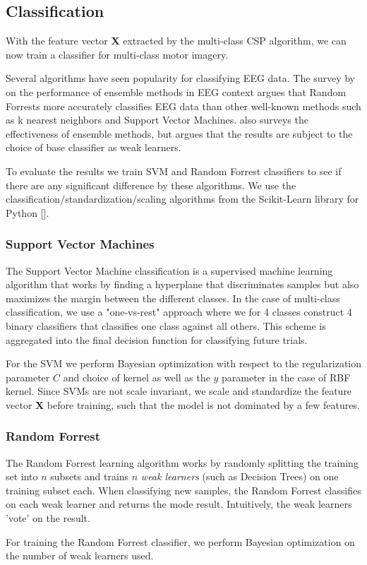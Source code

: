 \subsection{Classification}
With the feature vector $\mathbf{X}$ extracted by the multi-class CSP algorithm, we can now train a classifier for multi-class motor imagery.

Several algorithms have seen popularity for classifying EEG data. The survey by \citet{chan2015systematic} on the performance of ensemble methods in EEG context argues that Random Forrests more accurately classifies EEG data than other well-known methods such as k nearest neighbors and Support Vector Machines. \citet{sun2007experimental} also surveys the effectiveness of ensemble methods, but argues that the results are subject to the choice of base classifier as weak learners.

To evaluate the results we train SVM and Random Forrest classifiers to see if there are any significant difference by these algorithms. We use the classification/standardization/scaling algorithms from the Scikit-Learn library for Python [\cite{scikit-learn}].  

\subsubsection{Support Vector Machines}
The Support Vector Machine classification is a supervised machine learning algorithm that works by finding a hyperplane that discriminates samples but also maximizes the margin between the different classes. In the case of multi-class classification, we use a "one-vs-rest" approach where we for 4 classes construct 4 binary classifiers that classifies one class against all others. This scheme is aggregated into the final decision function for classifying future trials.

For the SVM we perform Bayesian optimization with respect to the regularization parameter $C$ and choice of kernel as well as the $y$ parameter in the case of RBF kernel. Since SVMs are not scale invariant, we scale and standardize the feature vector $\mathbf{X}$ before training, such that the model is not dominated by a few features.

\subsubsection{Random Forrest}
The Random Forrest learning algorithm works by randomly splitting the training set into $n$ subsets and trains $n$ \emph{weak learners} (such as Decision Trees) on one training subset each. When classifying new samples, the Random Forrest classifies on each weak learner and returns the mode result. Intuitively, the weak learners 'vote' on the result.

For training the Random Forrest classifier, we perform Bayesian optimization on the number of weak learners used.